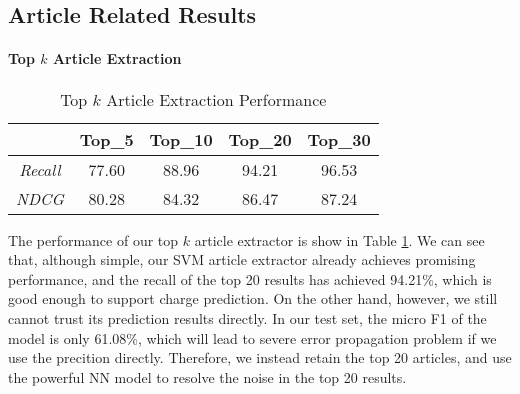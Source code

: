 \subsection{Article Related Results}
\paragraph{Top $k$ Article Extraction}
\begin{table}
\centering
\normalsize{
\begin{tabular}{|c|c|c|c|c|}
\hline
				& \textbf{Top\_5} 	& \textbf{Top\_10} 		& \textbf{Top\_20} 	& \textbf{Top\_30} \\
\hline
\textit{Recall} 		& 77.60			& 88.96  				& 94.21			& 96.53 	\\
\hline
\textit{NDCG} 		& 80.28			& 84.32  				& 86.47			& 87.24 	\\
\hline
\end{tabular}
}
\caption{Top $k$ Article Extraction Performance}
\label{tab_article_extraction}
\end{table}

The performance of our top $k$ article extractor is show in Table \ref{tab_article_extraction}.
We can see that, although simple, our SVM article extractor already achieves promising performance, and the recall of the top 20 results has achieved 94.21\%, which is good enough to support charge prediction. 
On the other hand, however, we still cannot trust its prediction results directly.  In our test set, the micro F1 of the model is only 61.08\%, which will lead to severe error propagation problem if we use the precition directly. Therefore, we instead retain the top 20 articles, and use the powerful NN model to resolve the noise in the top 20 results.


